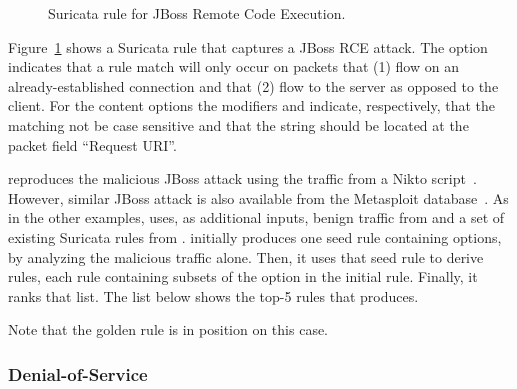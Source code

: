 \documentclass[sigconf,review, anonymous]{acmart}
\begin{document}
\begin{figure}[H]
  
  \caption{\label{fig:rule-jboss}Suricata rule for JBoss Remote Code Execution.}
\end{figure}


Figure~\ref{fig:rule-jboss} shows a Suricata rule that captures a
JBoss RCE attack.  The option 
indicates that a rule match will only occur on packets that (1) flow
on an already-established connection and that (2) flow to the server
as opposed to the client. For the content options the modifiers
 and  indicate, respectively, that
the matching not be case sensitive and that the string should be
located at the packet field ``Request URI''. 

\tname{} reproduces the malicious JBoss attack using the traffic from
a Nikto script~\cite{nikto}. However, similar JBoss attack is also
available from the Metasploit database~\cite{metasploit}. As in the
other examples, \tname{} uses, as additional inputs, benign traffic
from  and a set of existing Suricata rules from
. \tname{} initially produces one seed rule containing
 options, by analyzing the malicious traffic alone. Then, it
uses that seed rule to derive  rules, each rule containing
subsets of the option in the initial rule. Finally, it ranks that
list. The list below shows the top-5 rules that \tname{}
produces.


Note that the golden rule is in position  on this
case. 

\subsubsection{Denial-of-Service}
\label{sec:dos}
\end{document}
